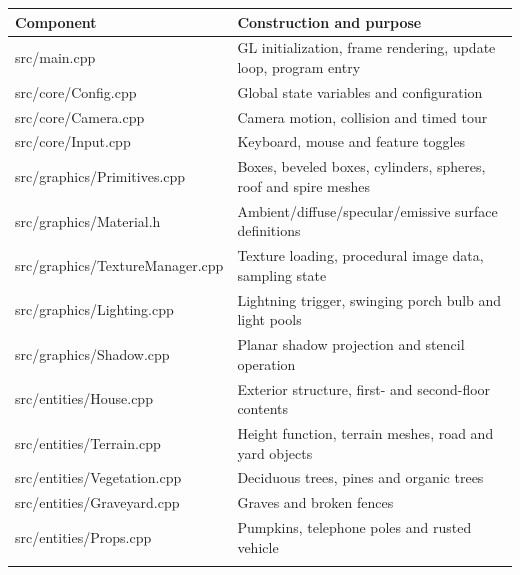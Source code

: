 \documentclass[10pt,a4paper,oneside]{article}
\begin{document}
\begin{longtable}{p{}p{}}\toprule\textbf{Component} & \textbf{Construction and purpose}\\\midrule\endhead

src/main.cpp & GL initialization, frame rendering, update loop, program entry\\\addlinespace[3pt]

src/core/Config.cpp & Global state variables and configuration\\\addlinespace[3pt]

src/core/Camera.cpp & Camera motion, collision and timed tour\\\addlinespace[3pt]

src/core/Input.cpp & Keyboard, mouse and feature toggles\\\addlinespace[3pt]

src/graphics/Primitives.cpp & Boxes, beveled boxes, cylinders, spheres, roof and spire meshes\\\addlinespace[3pt]

src/graphics/Material.h & Ambient/diffuse/specular/emissive surface definitions\\\addlinespace[3pt]

src/graphics/TextureManager.cpp & Texture loading, procedural image data, sampling state\\\addlinespace[3pt]

src/graphics/Lighting.cpp & Lightning trigger, swinging porch bulb and light pools\\\addlinespace[3pt]

src/graphics/Shadow.cpp & Planar shadow projection and stencil operation\\\addlinespace[3pt]

src/entities/House.cpp & Exterior structure, first- and second-floor contents\\\addlinespace[3pt]

src/entities/Terrain.cpp & Height function, terrain meshes, road and yard objects\\\addlinespace[3pt]

src/entities/Vegetation.cpp & Deciduous trees, pines and organic trees\\\addlinespace[3pt]

src/entities/Graveyard.cpp & Graves and broken fences\\\addlinespace[3pt]

src/entities/Props.cpp & Pumpkins, telephone poles and rusted vehicle\\\addlinespace[3pt]


\end{longtable}
\end{document}
